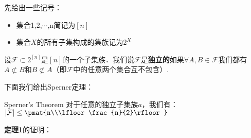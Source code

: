 
先给出一些记号：
\begin{itemize}
\item 集合{1,2,$\cdots$,n}简记为$[n]$
\item 集合$X$的所有子集构成的集族记为$2^{X}$
\end{itemize}

\begin{definition}{}
设$\mathcal{F}\subset 2^{[n]}$是$[n]$的一个子集族．我们说$\mathcal{F}$是\textbf{独立的}如果$\forall A,B\in \mathcal{F}$我们都有$A\not\subset B$和$B\not\subset A$（即$\mathcal{F}$中的任意两个集合互不包含）.
\end{definition}

下面我们给出Sperner定理：
\begin{theorem}{Sperner's Theorem}
对于任意的独立子集族$a$，我们有：$|\mathcal{F}|\leq \pmat{n\\\lfloor \frac{n}{2}\rfloor}$

\end{theorem}

\textbf{定理1}的证明：

